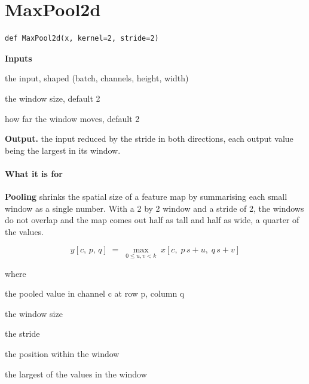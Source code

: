 \section{MaxPool2d}
\begin{lstlisting}[style=sig]
def MaxPool2d(x, kernel=2, stride=2)
\end{lstlisting}

\noindent\textbf{Inputs}
\begin{description}[leftmargin=2.2em,style=nextline,font=\normalfont\ttfamily]\setlength\itemsep{1pt}
  \item[{x}] \normalfont the input, shaped (batch, channels, height, width)
  \item[{kernel}] \normalfont the window size, default 2
  \item[{stride}] \normalfont how far the window moves, default 2
\end{description}

\noindent\textbf{Output.} the input reduced by the stride in both directions, each output value being the largest in its window.


\paragraph{What it is for}
\textbf{Pooling} shrinks the spatial size of a feature map by summarising each small window as a single number. With a 2 by 2 window and a stride of 2, the windows do not overlap and the map comes out half as tall and half as wide, a quarter of the values.


\begin{equation}
y[c,\,p,\,q] \;=\; \max_{0 \le u,v < k} \; x[c,\; p\,s+u,\; q\,s+v]
\end{equation}

\noindent where
\begin{description}[leftmargin=2.4em,style=nextline,font=\normalfont\ttfamily]\setlength\itemsep{1pt}
  \item[{$y[c,p,q]$}] \normalfont the pooled value in channel c at row p, column q
  \item[{$k$}] \normalfont the window size
  \item[{$s$}] \normalfont the stride
  \item[{$u,\,v$}] \normalfont the position within the window
  \item[{$\max$}] \normalfont the largest of the values in the window
\end{description}

